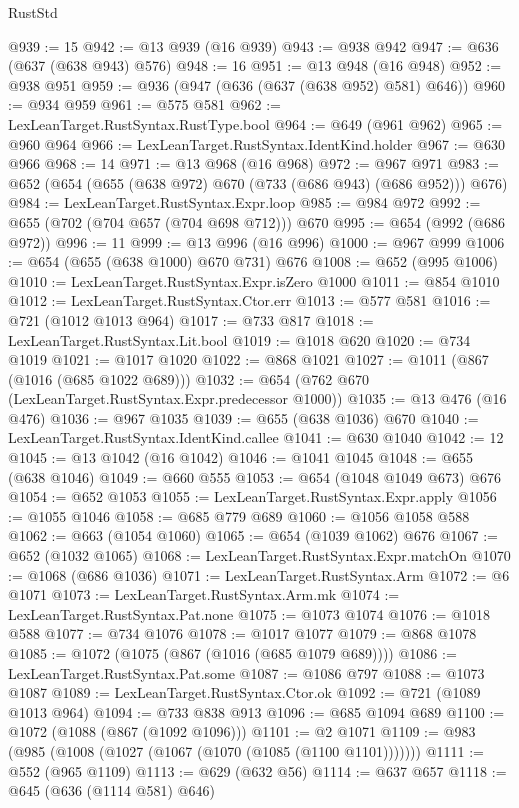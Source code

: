 \begin{lexlean}{RustStd}
\begin{coremodule}
@939 := 15
@942 := @13 @939 (@16 @939)
@943 := @938 @942
@947 := @636 (@637 (@638 @943) @576)
@948 := 16
@951 := @13 @948 (@16 @948)
@952 := @938 @951
@959 := @936 (@947 (@636 (@637 (@638 @952) @581) @646))
@960 := @934 @959
@961 := @575 @581
@962 := LexLeanTarget.RustSyntax.RustType.bool
@964 := @649 (@961 @962)
@965 := @960 @964
@966 := LexLeanTarget.RustSyntax.IdentKind.holder
@967 := @630 @966
@968 := 14
@971 := @13 @968 (@16 @968)
@972 := @967 @971
@983 := @652 (@654 (@655 (@638 @972) @670 (@733 (@686 @943) (@686 @952))) @676)
@984 := LexLeanTarget.RustSyntax.Expr.loop
@985 := @984 @972
@992 := @655 (@702 (@704 @657 (@704 @698 @712))) @670
@995 := @654 (@992 (@686 @972))
@996 := 11
@999 := @13 @996 (@16 @996)
@1000 := @967 @999
@1006 := @654 (@655 (@638 @1000) @670 @731) @676
@1008 := @652 (@995 @1006)
@1010 := LexLeanTarget.RustSyntax.Expr.isZero @1000
@1011 := @854 @1010
@1012 := LexLeanTarget.RustSyntax.Ctor.err
@1013 := @577 @581
@1016 := @721 (@1012 @1013 @964)
@1017 := @733 @817
@1018 := LexLeanTarget.RustSyntax.Lit.bool
@1019 := @1018 @620
@1020 := @734 @1019
@1021 := @1017 @1020
@1022 := @868 @1021
@1027 := @1011 (@867 (@1016 (@685 @1022 @689)))
@1032 := @654 (@762 @670 (LexLeanTarget.RustSyntax.Expr.predecessor @1000))
@1035 := @13 @476 (@16 @476)
@1036 := @967 @1035
@1039 := @655 (@638 @1036) @670
@1040 := LexLeanTarget.RustSyntax.IdentKind.callee
@1041 := @630 @1040
@1042 := 12
@1045 := @13 @1042 (@16 @1042)
@1046 := @1041 @1045
@1048 := @655 (@638 @1046)
@1049 := @660 @555
@1053 := @654 (@1048 @1049 @673) @676
@1054 := @652 @1053
@1055 := LexLeanTarget.RustSyntax.Expr.apply
@1056 := @1055 @1046
@1058 := @685 @779 @689
@1060 := @1056 @1058 @588
@1062 := @663 (@1054 @1060)
@1065 := @654 (@1039 @1062) @676
@1067 := @652 (@1032 @1065)
@1068 := LexLeanTarget.RustSyntax.Expr.matchOn
@1070 := @1068 (@686 @1036)
@1071 := LexLeanTarget.RustSyntax.Arm
@1072 := @6 @1071
@1073 := LexLeanTarget.RustSyntax.Arm.mk
@1074 := LexLeanTarget.RustSyntax.Pat.none
@1075 := @1073 @1074
@1076 := @1018 @588
@1077 := @734 @1076
@1078 := @1017 @1077
@1079 := @868 @1078
@1085 := @1072 (@1075 (@867 (@1016 (@685 @1079 @689))))
@1086 := LexLeanTarget.RustSyntax.Pat.some
@1087 := @1086 @797
@1088 := @1073 @1087
@1089 := LexLeanTarget.RustSyntax.Ctor.ok
@1092 := @721 (@1089 @1013 @964)
@1094 := @733 @838 @913
@1096 := @685 @1094 @689
@1100 := @1072 (@1088 (@867 (@1092 @1096)))
@1101 := @2 @1071
@1109 := @983 (@985 (@1008 (@1027 (@1067 (@1070 (@1085 (@1100 @1101)))))))
@1111 := @552 (@965 @1109)
@1113 := @629 (@632 @56)
@1114 := @637 @657
@1118 := @645 (@636 (@1114 @581) @646)

\end{coremodule}
\end{lexlean}
